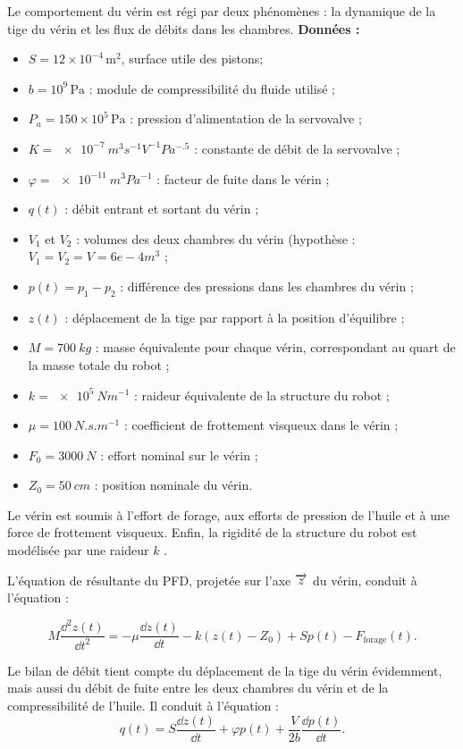 \documentclass[10pt,fleqn]{article} %
\begin{document}
\begin{multicols}{2}
Le comportement du vérin est régi par deux phénomènes : la dynamique de la tige du vérin et
les flux de débits dans les chambres.
\textbf{Données : }
\begin{itemize}
\item $S=12\times 10^{-4}\,\text{m}^2$, surface utile des pistons;
\item $ b = {10^9}\,\text{Pa}$ : module de compressibilité du fluide utilisé ;
\item $P_a = 150 \times 10^5\,\text{Pa}$ : pression d’alimentation de la servovalve ;
\item $K = \SI{e-7}{m^3s^{-1}V^{-1}Pa^{-.5}}$ : constante de débit de la servovalve ;
\item $\varphi = \SI{e-11}{m^3 Pa^{-1}}$ : facteur de fuite dans le vérin ;
\item $q(t )$ : débit entrant et sortant du vérin ;
\item $V_1$ et $V_2$ : volumes des deux chambres du vérin (hypothèse : $V_1 = V_2 = V = {6e-4}{m^3}$ ;
\item $p(t ) = p_1 -p_2$ : différence des pressions dans les chambres du vérin ;
\item $z (t )$ : déplacement de la tige par rapport à la position d’équilibre ;
\item $M = \SI{700}{kg}$ : masse équivalente pour chaque vérin, correspondant au quart de la masse
totale du robot ;
\item $k = \SI{e5}{Nm^{-1}}$ : raideur équivalente de la structure du robot ;
\item $\mu = \SI{100}{N.s.m^{-1}}$ : coefficient de frottement visqueux dans le vérin ;
\item $F_0 = \SI{3000}{N}$ : effort nominal sur le vérin ;
\item $Z_0 = \SI{50}{cm}$ : position nominale du vérin.
\end{itemize}
Le vérin est soumis à l’effort de forage, aux efforts de pression de l’huile et à une force de
frottement visqueux. Enfin, la rigidité de la structure du robot est modélisée par une raideur $k$ .

L’équation de résultante du PFD, projetée sur l’axe $\overrightarrow{z}$ du vérin, conduit à l’équation :

$$
M\dfrac{\dd^2 z(t)}{\dd t^2} = -\mu \dfrac{\dd z (t)}{\dd t} - k\left( z(t) - Z_0\right) +Sp(t)-F_{\text{forage}}(t).
$$

Le bilan de débit tient compte du déplacement de la tige du vérin évidemment, mais aussi du
débit de fuite entre les deux chambres du vérin et de la compressibilité de l’huile. Il conduit à
l’équation :
$$
q(t)=S \dfrac{\dd z (t)}{\dd t} +\varphi p(t) + \dfrac{V}{2b}  \dfrac{\dd p(t)}{\dd t}.
$$






\end{multicols}
\end{document}
